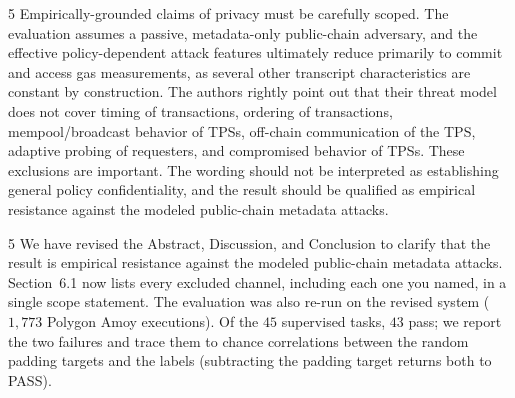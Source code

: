 \begin{reviewcomment}{5}
	Empirically-grounded claims of privacy must be carefully scoped.
	The evaluation assumes a passive, metadata-only public-chain adversary, and the effective policy-dependent attack features ultimately reduce primarily to commit and access gas measurements, as several other transcript characteristics are constant by construction.
	The authors rightly point out that their threat model does not cover timing of transactions, ordering of transactions, mempool/broadcast behavior of TPSs, off-chain communication of the TPS, adaptive probing of requesters, and compromised behavior of TPSs.
	These exclusions are important.
	The wording should not be interpreted as establishing general policy confidentiality, and the result should be qualified as empirical resistance against the modeled public-chain metadata attacks.
\end{reviewcomment}

\begin{reviewresponse}{5}
	We have revised the Abstract, Discussion, and Conclusion to clarify that the result is empirical resistance against the modeled public-chain metadata attacks.
	Section~6.1 now lists every excluded channel, including each one you named, in a single scope statement.
	The evaluation was also re-run on the revised system ($1{,}773$ Polygon Amoy executions).
	Of the $45$ supervised tasks, $43$ pass; we report the two failures and trace them to chance correlations between the random padding targets and the labels (subtracting the padding target returns both to PASS).

\end{reviewresponse}
